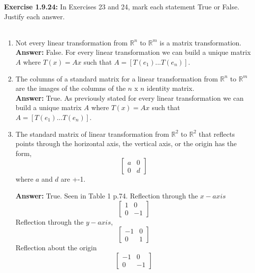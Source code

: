 \documentclass{amsart}
\def\RR{{\mathbb R}}
\begin{document}
\noindent\textbf{Exercise 1.9.24: } In Exercises 23 and 24, mark each statement True or False. Justify each answer.\\\\
\begin{enumerate}


\item Not every linear transformation from $\RR^{n}$ to $\RR^{m}$ is a matrix transformation.\\ 
\textbf{Answer: } False. For every linear transformation we can build a unique matrix $A$ where $T(x) = Ax$ such that $A = [T(e_1)...T(e_n)]$.
\vspace{1in}


\item The columns of a standard matrix for a linear transformation from $\RR^{n}$ to $\RR^{m}$ are the images of the columns of the $n$ x $n$ identity matrix.\\
\textbf{Answer: }True. As previously stated for every linear transformation we can build a unique matrix $A$ where $T(x) = Ax$ such that $A = [T(e_1)...T(e_n)]$. 
\vspace{1in}


\item The standard matrix of linear transformation from $\RR^{2}$ to $\RR^{2}$ that reflects points through the horizontal axis, the vertical axis, or the origin has the form,
\begin{equation}
\begin{bmatrix}
a&0\\
0&d
\end{bmatrix}
\end{equation}
where $a$ and $d$ are +-1.

\textbf{Answer: } True. Seen in Table 1 p.74. Reflection through the $x-axis$
\begin{equation}
\begin{bmatrix}
1&0\\
0&-1
\end{bmatrix}
\end{equation}
Reflection through the $y-axis$,
\begin{equation}
\begin{bmatrix}
-1&0\\
0&1
\end{bmatrix}
\end{equation}
Reflection about the origin
\begin{equation}
\begin{bmatrix}
-1&0\\
0&-1
\end{bmatrix}
\end{equation}
\vspace{1in}



\end{enumerate}
\end{document}
